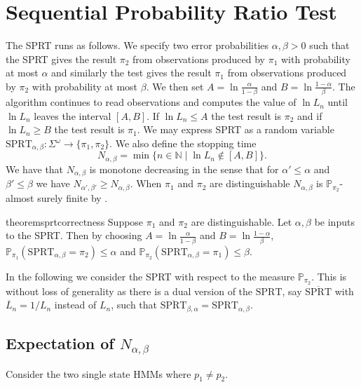 \documentclass[a4paper,UKenglish,cleveref, autoref,mathscr]{lipics-v2019}
\newcommand{\NN}{\mathbb{N}}
\newcommand{\PP}{\mathbb{P}}
\newcommand{\1}{\mathbbm{1}}
\newcommand{\SPRT}{\mathrm{SPRT}}
\begin{document}
\section{Sequential Probability Ratio Test}\label{liexpsubsect}

The SPRT runs as follows. We specify two error probabilities $\alpha, \beta > 0$ such that the SPRT gives the result $\pi_2$ from observations produced by $\pi_1$ with probability at most $\alpha$ and similarly the test gives the result $\pi_1$ from observations produced by $\pi_2$ with probability at most $\beta$. We then set $A = \ln \frac{\alpha}{1 - \beta}$ and $B = \ln \frac{1 - \alpha}{\beta}$. The algorithm continues to read observations and computes the value of $\ln L_n$ until $\ln L_n$ leaves the interval $[A,B]$. If $\ln L_n \leq A$ the test result is $\pi_2$ and if $\ln L_n \geq B$ the test result is $\pi_1$. We may express SPRT as a random variable $\SPRT_{\alpha, \beta} : \Sigma^\omega \rightarrow \{\pi_1, \pi_2\}$. We also define the stopping time
\begin{equation*}
N_{\alpha, \beta} = \min \{n \in \NN \mid \ln L_n \not\in [A, B]\}.
\end{equation*}
We have that $N_{\alpha, \beta}$ is monotone decreasing in the sense that for $\alpha' \leq \alpha$ and $\beta' \leq \beta$ we have $N_{\alpha', \beta'} \geq N_{\alpha, \beta}$. When $\pi_1$ and $\pi_2$ are distinguishable $N_{\alpha, \beta}$ is $\PP_{\pi_2}$-almost surely finite by .

\begin{restatable}{theorem}{sprtcorrectness}\label{sprtcorrectness}
Suppose $\pi_1$ and $\pi_2$ are distinguishable. Let $\alpha, \beta$ be inputs to the SPRT. Then by choosing $A = \ln \frac{\alpha}{1 - \beta}$ and $B = \ln \frac{1 - \alpha}{\beta}$, $\PP_{\pi_1} (\SPRT_{\alpha, \beta} = \pi_2) \leq \alpha$ and $\PP_{\pi_2} (\SPRT_{\alpha, \beta} = \pi_1) \leq \beta$.
\end{restatable}


In the following we consider the SPRT with respect to the measure $\PP_{\pi_2}$. This is without loss of generality as there is a dual version of the $\SPRT$, say $\overline{\SPRT}$ with $\overline{L}_n = 1/L_n$ instead of $L_n$, such that $ \overline{\SPRT}_{\beta, \alpha} = \SPRT_{\alpha, \beta}$.

\subsection{Expectation of $N_{\alpha, \beta}$}
Consider the two single state HMMs where $p_1 \neq p_2$. 
\end{document}
